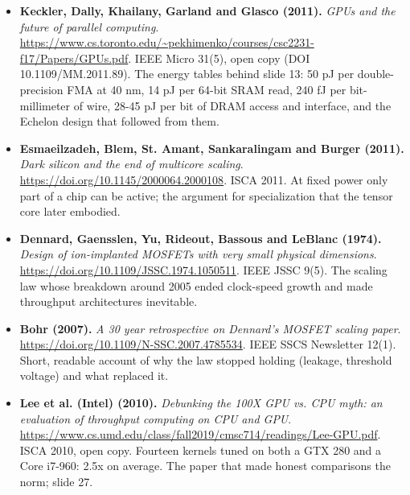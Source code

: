 \begin{itemize}[leftmargin=1.2em,itemsep=3pt]
\item \textbf{Keckler, Dally, Khailany, Garland and Glasco (2011).} \textit{GPUs and the future of parallel computing}. \url{https://www.cs.toronto.edu/~pekhimenko/courses/csc2231-f17/Papers/GPUs.pdf}. IEEE Micro 31(5), open copy (DOI 10.1109/MM.2011.89). The energy tables behind slide 13: 50 pJ per double-precision FMA at 40 nm, 14 pJ per 64-bit SRAM read, 240 fJ per bit-millimeter of wire, 28-45 pJ per bit of DRAM access and interface, and the Echelon design that followed from them.
\item \textbf{Esmaeilzadeh, Blem, St. Amant, Sankaralingam and Burger (2011).} \textit{Dark silicon and the end of multicore scaling}. \url{https://doi.org/10.1145/2000064.2000108}. ISCA 2011. At fixed power only part of a chip can be active; the argument for specialization that the tensor core later embodied.
\item \textbf{Dennard, Gaensslen, Yu, Rideout, Bassous and LeBlanc (1974).} \textit{Design of ion-implanted MOSFETs with very small physical dimensions}. \url{https://doi.org/10.1109/JSSC.1974.1050511}. IEEE JSSC 9(5). The scaling law whose breakdown around 2005 ended clock-speed growth and made throughput architectures inevitable.
\item \textbf{Bohr (2007).} \textit{A 30 year retrospective on Dennard's MOSFET scaling paper}. \url{https://doi.org/10.1109/N-SSC.2007.4785534}. IEEE SSCS Newsletter 12(1). Short, readable account of why the law stopped holding (leakage, threshold voltage) and what replaced it.
\item \textbf{Lee et al. (Intel) (2010).} \textit{Debunking the 100X GPU vs. CPU myth: an evaluation of throughput computing on CPU and GPU}. \url{https://www.cs.umd.edu/class/fall2019/cmsc714/readings/Lee-GPU.pdf}. ISCA 2010, open copy. Fourteen kernels tuned on both a GTX 280 and a Core i7-960: 2.5x on average. The paper that made honest comparisons the norm; slide 27.
\end{itemize}
